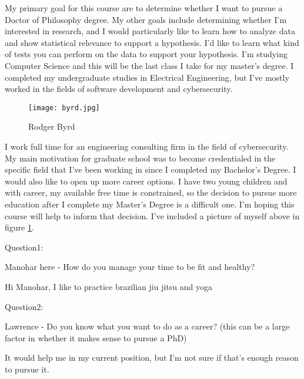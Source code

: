 My primary goal for this course are to determine whether I want to pursue a Doctor of Philosophy degree. My other goals include determining whether I'm interested in research, and I would particularly like to learn how to analyze data and show statistical relevance to support a hypothesis. I'd like to learn what kind of tests you can perform on the data to support your hypothesis. I'm studying Computer Science and this will be the last class I take for my master's degree. I completed my undergraduate studies in Electrical Engineering, but I've mostly worked in the fields of software development and cybersecurity.
\begin{figure}
  \centerline{\texttt{[image: byrd.jpg]}}
  \caption{Rodger Byrd}
  \label{fig:HS}
\end{figure}
I work full time for an engineering consulting firm in the field of cybersecurity. My main motivation for graduate school was to become credentialed in the specific field that I've been working in since I completed my Bachelor's Degree. I would also like to open up more career options. I have two young children and with career, my available free time is constrained, so the decision to pursue more education after I complete my Master's Degree is a difficult one. I'm hoping this course will help to inform that decision. I've included a picture of myself above in figure \ref{fig:HS}.


Question1:

Manohar here - How do you manage your time to be fit and healthy?

Hi Manohar, I like to practice brazilian jiu jitsu and yoga

Question2:

Lawrence - Do you know what you want to do as a career? (this can be a large factor in whether it makes sense to pursue a PhD)

It would help me in my current position, but I'm not sure if that's enough reason to pursue it.
